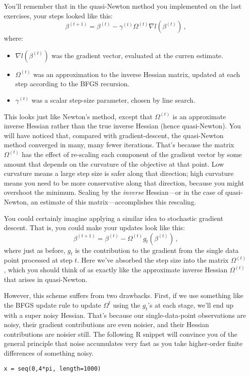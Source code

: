 \documentclass{mynotes}
\begin{document}
\begin{enumerate}[(A)]
You'll remember that in the quasi-Newton method you implemented on the last exercises, your steps looked like this:
$$
\beta^{(t+1)} = \beta^{(t)} - \gamma^{(t)} \Omega^{(t)} \nabla l(\beta^{(t)}) \, ,
$$
where:
\begin{itemize}
\item $\nabla l(\beta^{(t)})$ was the gradient vector, evaluated at the curren estimate.
\item $\Omega^{(t)}$ was an approximation to the inverse Hessian matrix, updated at each step according to the BFGS recursion.
\item $\gamma^{(t)}$ was a scalar step-size parameter, chosen by line search.
\end{itemize}
This looks just like Newton's method, except that $\Omega^{(t)}$ is an approximate inverse Hessian rather than the true inverse Hessian (hence quasi-Newton).  You will have noticed that, compared with gradient-descent, the quasi-Newton method converged in many, many fewer iterations.  That's because the matrix $\Omega^{(t)}$ has the effect of re-scaling each component of the gradient vector by some amount that depends on the curvature of the objective at that point.  Low curvature means a large step size is safer along that direction; high curvature means you need to be more conservative along that direction, because you might overshoot the minimum.  Scaling by the \emph{inverse} Hessian---or in the case of quasi-Newton, an estimate of this matrix---accomplishes this rescaling.

You could certainly imagine applying a similar idea to stochastic gradient descent.  That is, you could make your updates look like this:
\begin{equation}
\label{eqn:online_quasi_newton}
\beta^{(t+1)} = \beta^{(t)} - \Omega^{(t)} g_t(\beta^{(t)}) \, ,
\end{equation}
where just as before, $g_t$ is the contribution to the gradient from the single data point processed at step $t$.  Here we've absorbed the step size into the matrix $\Omega^{(t)}$, which you should think of as exactly like the approximate inverse Hessian $\Omega^{(t)}$ that arises in quasi-Newton.

However, this scheme suffers from two drawbacks.  First, if we use something like the BFGS update rule to update $\Omega^t$ using the $g_t$'s at each stage, we'll end up with a super noisy Hessian.  That's because our single-data-point observations are noisy, their gradient contributions are even noisier, and their Hessian contributions are noisier still.  The following R snippet will convince you of the general principle that noise accumulates very fast as you take higher-order finite differences of something noisy.
\begin{verbatim}
x = seq(0,4*pi, length=1000)


\end{verbatim}
\end{enumerate}
\end{document}
